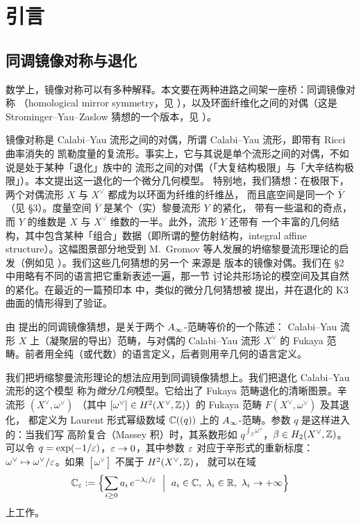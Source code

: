 \section{引言}

\subsection{同调镜像对称与退化}

数学上，镜像对称可以有多种解释。本文要在两种进路之间架一座桥：同调镜像对称
（homological mirror symmetry，见 \cite{Ko}），以及环面纤维化之间的对偶（这是
Strominger--Yau--Zaslow 猜想的一个版本，见 \cite{SYZ}）。

镜像对称是 Calabi--Yau 流形之间的对偶，所谓 Calabi--Yau 流形，即带有 Ricci 曲率消失的
凯勒度量的复流形。事实上，它与其说是单个流形之间的对偶，不如说是处于某种「退化」族中的
流形之间的对偶（「大复结构极限」与「大辛结构极限」）。本文提出这一退化的一个微分几何模型。
特别地，我们猜想：在极限下，两个对偶流形 $X$ 与 $X^{\vee}$ 都成为以环面为纤维的纤维丛，
而且底空间是同一个 $\bar Y$（见 \S3）。度量空间 $\bar Y$ 是某个（实）黎曼流形 $Y$ 的紧化，
带有一些温和的奇点，而 $Y$ 的维数是 $X$ 与 $X^{\vee}$ 维数的一半。此外，流形 $Y$ 还带有
一个丰富的几何结构，其中包含某种「组合」数据（即所谓的整仿射结构，integral affine structure）。这幅图景部分地受到
M.~Gromov 等人发展的坍缩黎曼流形理论的启发（例如见 \cite{CG}）。我们这些几何猜想的另一个
来源是 \cite{SYZ} 版本的镜像对偶。我们在 \S2 中用略有不同的语言把它重新表述一遍，那一节
讨论共形场论的模空间及其自然的紧化。在最近的一篇预印本 \cite{GW} 中，类似的微分几何猜想被
提出，并在退化的 K3 曲面的情形得到了验证。

由 \cite{Ko} 提出的同调镜像猜想，是关于两个 $A_{\infty}$-范畴等价的一个陈述：
Calabi--Yau 流形 $X$ 上（凝聚层的导出）范畴，与对偶的 Calabi--Yau 流形 $X^{\vee}$ 的
Fukaya 范畴。前者用全纯（或代数）的语言定义，后者则用辛几何的语言定义。

我们把坍缩黎曼流形理论的想法应用到同调镜像猜想上。我们把退化 Calabi--Yau 流形的这个模型
称为\emph{微分几何}模型。它给出了 Fukaya 范畴退化的清晰图景。辛流形 $(X^{\vee},\omega^{\vee})$
（其中 $[\omega^{\vee}]\in H^2(X^{\vee},\mathbb{Z})$）的 Fukaya 范畴 $F(X^{\vee},\omega^{\vee})$ 及其退化，
都定义为 Laurent 形式幂级数域 $\mathbb{C}((q))$ 上的 $A_{\infty}$-范畴。参数 $q$ 是这样进入的：当我们写
高阶复合（Massey 积）时，其系数形如 $q^{\int_{\beta}\omega^{\vee}}$，$\beta\in H_2(X^{\vee},\mathbb{Z})$。
可以令 $q=\exp(-1/\varepsilon)$，$\varepsilon\to 0$，其中参数 $\varepsilon$ 对应于辛形式的重新标度：
$\omega^{\vee}\mapsto \omega^{\vee}/\varepsilon$。如果 $[\omega^{\vee}]$ 不属于 $H^2(X^{\vee},\mathbb{Z})$，
就可以在域
\[
  \C_{\eps}:=\Bigl\{\sum_{i\ge 0}a_i\,e^{-\lam_i/\eps}\ \Bigm|\ a_i\in\C,\ \lam_i\in\R,\ \lam_i\to+\infty\Bigr\}
\]
上工作。

